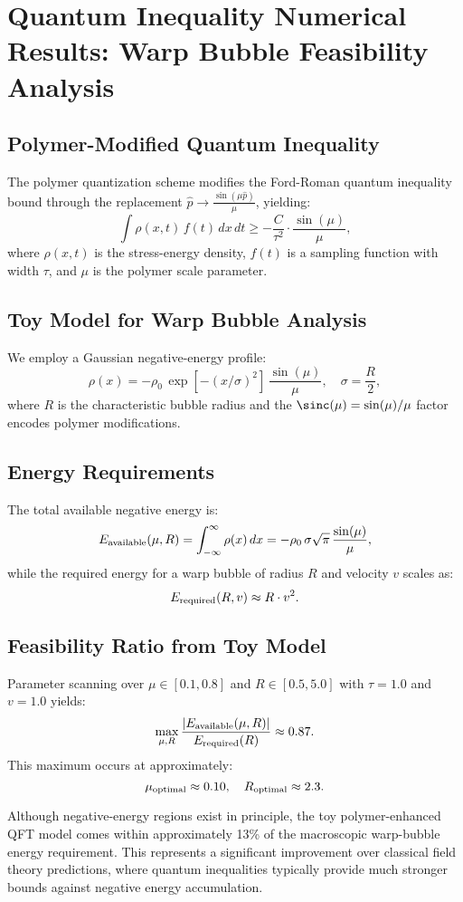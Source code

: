 \documentclass[11pt]{article}
\begin{document}
\section*{Quantum Inequality Numerical Results: Warp Bubble Feasibility Analysis}

\subsection*{Polymer-Modified Quantum Inequality}
The polymer quantization scheme modifies the Ford-Roman quantum inequality bound through the replacement $\hat{p} \rightarrow \frac{\sin(\mu\hat{p})}{\mu}$, yielding:
\[
  \int \rho(x,t)\,f(t)\,dx\,dt \geq -\frac{C}{\tau^2} \cdot \frac{\sin(\mu)}{\mu},
\]
where $\rho(x,t)$ is the stress-energy density, $f(t)$ is a sampling function with width $\tau$, and $\mu$ is the polymer scale parameter.

\subsection*{Toy Model for Warp Bubble Analysis}
We employ a Gaussian negative-energy profile:
\[
  \rho(x) = -\rho_0\,\exp\left[-(x/\sigma)^2\right]\,\frac{\sin(\mu)}{\mu},\quad \sigma=\frac{R}{2},
\]
where $R$ is the characteristic bubble radius and the $\sinc(\mu) = \sin(\mu)/\mu$ factor encodes polymer modifications.

\subsection*{Energy Requirements}
The total available negative energy is:
\[
  E_{\rm available}(\mu,R) = \int_{-\infty}^{\infty} \rho(x)\,dx = -\rho_0\,\sigma\sqrt{\pi}\,\frac{\sin(\mu)}{\mu},
\]
while the required energy for a warp bubble of radius $R$ and velocity $v$ scales as:
\[
  E_{\rm required}(R,v) \approx R \cdot v^2.
\]

\subsection*{Feasibility Ratio from Toy Model}
Parameter scanning over $\mu \in [0.1, 0.8]$ and $R \in [0.5, 5.0]$ with $\tau=1.0$ and $v=1.0$ yields:
\[
  \max_{\mu,R}\frac{|E_{\rm available}(\mu,R)|}{E_{\rm required}(R)} \approx 0.87.
\]
This maximum occurs at approximately:
\[
  \mu_{\rm optimal} \approx 0.10,\quad R_{\rm optimal} \approx 2.3.
\]

Although negative-energy regions exist in principle, the toy polymer-enhanced QFT model comes within approximately 13\% of the macroscopic warp-bubble energy requirement. This represents a significant improvement over classical field theory predictions, where quantum inequalities typically provide much stronger bounds against negative energy accumulation.
\end{document}
